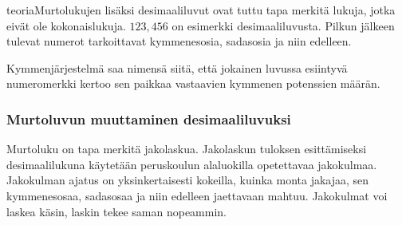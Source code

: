teoriaMurtolukujen lisäksi desimaaliluvut ovat tuttu tapa merkitä lukuja, jotka eivät ole kokonaislukuja. $123,456$ on esimerkki desimaaliluvusta. Pilkun jälkeen tulevat numerot tarkoittavat kymmenesosia, sadasosia ja niin edelleen.



Kymmenjärjestelmä saa nimensä siitä, että jokainen luvussa esiintyvä numeromerkki kertoo sen paikkaa vastaavien kymmenen potenssien määrän. %

\subsubsection*{Murtoluvun muuttaminen desimaaliluvuksi}

Murtoluku on tapa merkitä jakolaskua. Jakolaskun tuloksen esittämiseksi desimaalilukuna käytetään peruskoulun alaluokilla opetettavaa jakokulmaa. Jakokulman ajatus on yksinkertaisesti kokeilla, kuinka monta jakajaa, sen kymmenesosaa, sadasosaa ja niin edelleen jaettavaan mahtuu. Jakokulmat voi laskea käsin, laskin tekee saman nopeammin.

